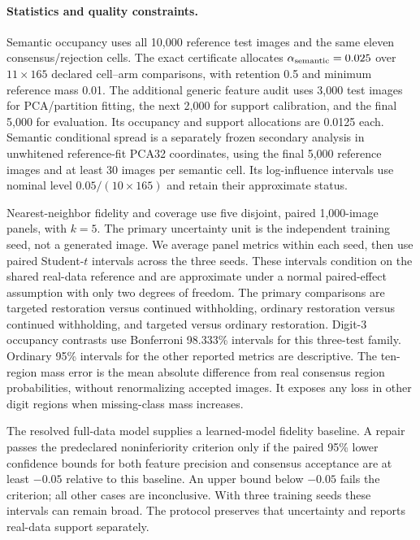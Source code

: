 \paragraph{Statistics and quality constraints.}
Semantic occupancy uses all 10,000 reference test images and the same eleven
consensus/rejection cells. The exact certificate allocates
$\alpha_{\rm semantic}=0.025$ over $11\times165$ declared cell--arm comparisons,
with retention 0.5 and minimum reference mass 0.01. The additional generic
feature audit uses 3,000 test images for PCA/partition fitting, the next 2,000
for support calibration, and the final 5,000 for evaluation. Its occupancy and
support allocations are 0.0125 each. Semantic conditional spread is a separately
frozen secondary analysis in unwhitened reference-fit PCA32 coordinates,
using the final 5,000 reference images and at least 30 images per semantic cell.
Its log-influence intervals use nominal level $0.05/(10\times165)$ and retain
their approximate status.

Nearest-neighbor fidelity and coverage use five disjoint, paired 1,000-image
panels, with $k=5$. The primary uncertainty unit is the independent training
seed, not a generated image. We average panel metrics within each seed, then
use paired Student-$t$ intervals across the three seeds. These intervals
condition on the shared real-data reference and are approximate
under a normal paired-effect assumption with only two degrees of freedom.
The primary comparisons
are targeted restoration versus continued withholding, ordinary restoration
versus continued withholding, and targeted versus ordinary restoration.
Digit-3 occupancy contrasts use Bonferroni 98.333\% intervals for this three-test
family. Ordinary 95\% intervals for the other reported metrics are descriptive.
The ten-region mass error is the mean absolute difference from real consensus
region probabilities, without renormalizing accepted images. It exposes any
loss in other digit regions when missing-class mass increases.

The resolved full-data model supplies a learned-model fidelity baseline. A
repair passes the predeclared noninferiority criterion only if the paired
95\% lower confidence bounds for both feature precision and consensus acceptance
are at least $-0.05$ relative to this baseline. An upper bound below $-0.05$
fails the criterion; all other cases are inconclusive. With three training
seeds these intervals can remain broad. The protocol preserves that uncertainty
and reports real-data support separately.

